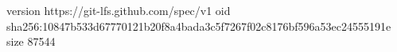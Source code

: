 version https://git-lfs.github.com/spec/v1
oid sha256:10847b533d67770121b20f8a4bada3c5f7267f02c8176bf596a53ec24555191e
size 87544
